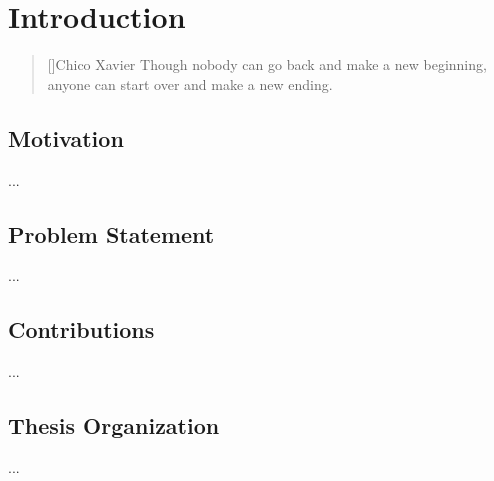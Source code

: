 \chapter{Introduction}
\label{ch:introduction}

\begin{quotation}[]{Chico Xavier}
Though nobody can go back and make a new beginning, anyone can start over and make a new ending.
\end{quotation}


\section{Motivation}
\label{sc:motivation}
...

\section{Problem Statement}
\label{sc:problems}
...

\section{Contributions}
\label{sc:contributions}
...

\section{Thesis Organization}
\label{sc:organization}
...
